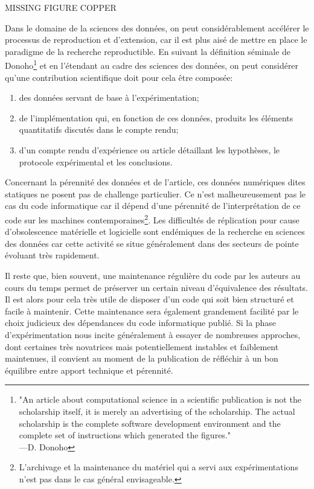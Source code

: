MISSING FIGURE COPPER

Dans le domaine de la sciences des données, on peut considérablement accélérer le processus de reproduction et d'extension, car il est plus aisé de mettre en place le paradigme de la recherche reproductible. En suivant la définition séminale de Donoho\footnote{"An article about computational science in a scientific publication is not the scholarship itself, it is merely an advertising of the scholarship. The actual scholarship is the complete software development environment and the complete set of instructions which generated the figures." \\—D. Donoho} et en l'étendant au cadre des sciences des données, on peut considérer qu'une contribution scientifique doit pour cela être composée:
\begin{enumerate}
  \item des données servant de base à l'expérimentation;
  \item de l'implémentation qui, en fonction de ces données, produits les éléments quantitatifs discutés dans le compte rendu;
  \item d'un compte rendu d'expérience ou article détaillant les hypothèses, le protocole expérimental et les conclusions.
\end{enumerate}

Concernant la pérennité des données et de l'article, ces données numériques dites \og statiques \fg ne posent pas de challenge particulier. Ce n'est malheureusement pas le cas du code informatique car il dépend d'une pérennité de l'interprétation de ce code sur les machines contemporaines\footnote{L'archivage et la maintenance du matériel qui a servi aux expérimentations n'est pas dans le cas général envisageable.}. Les difficultés de réplication pour cause d'obsolescence matérielle et logicielle sont endémiques de la recherche en sciences des données car cette activité se situe généralement dans des secteurs de pointe évoluant très rapidement.

Il reste que, bien souvent, une maintenance régulière du code par les auteurs au cours du temps permet de préserver un certain niveau d'équivalence des résultats. Il est alors pour cela très utile de disposer d'un code qui soit bien structuré et facile à maintenir. Cette maintenance sera également grandement facilité par le choix judicieux des dépendances du code informatique publié. Si la phase d'expérimentation nous incite généralement à essayer de nombreuses approches, dont certaines très novatrices mais potentiellement instables et faiblement maintenues, il convient au moment de la publication de réfléchir à un bon équilibre entre apport technique et pérennité.

